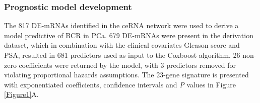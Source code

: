 \subsubsection{Prognostic model development}
The 817 DE-mRNAs identified in the ceRNA network were used to derive a model predictive of BCR in PCa. 679 DE-mRNAs were present in the derivation dataset, which in combination with the clinical covariates Gleason score and PSA, resulted in 681 predictors used as input to the Coxboost algorithm. 26 non-zero coefficients were returned by the model, with 3 predictors removed for violating proportional hazards assumptions. The 23-gene signature is presented with exponentiated coefficients, confidence intervals and \textit{P} values in Figure \ref{Figure1}A. \par


\begin{table}[ht!]
\caption[Differentially expressed RNA biotypes]{\textbf{Differentially expressed RNA biotypes} returned by Limma and unique overlapping RNAs with the same fold change direction.\label{table1}}


\end{table}
